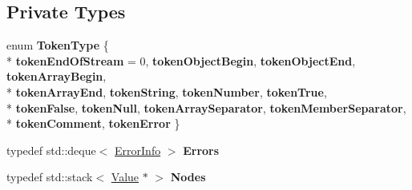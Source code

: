 \subsection*{Private Types}
\begin{DoxyCompactItemize}
\item 
\hypertarget{class_json_1_1_reader_aa35e6ab574dc399a0a645ad98ed66bc9}{}enum {\bfseries Token\+Type} \{ \\*
{\bfseries token\+End\+Of\+Stream} = 0, 
{\bfseries token\+Object\+Begin}, 
{\bfseries token\+Object\+End}, 
{\bfseries token\+Array\+Begin}, 
\\*
{\bfseries token\+Array\+End}, 
{\bfseries token\+String}, 
{\bfseries token\+Number}, 
{\bfseries token\+True}, 
\\*
{\bfseries token\+False}, 
{\bfseries token\+Null}, 
{\bfseries token\+Array\+Separator}, 
{\bfseries token\+Member\+Separator}, 
\\*
{\bfseries token\+Comment}, 
{\bfseries token\+Error}
 \}\label{class_json_1_1_reader_aa35e6ab574dc399a0a645ad98ed66bc9}

\item 
\hypertarget{class_json_1_1_reader_aae51e8f5bab3f067261c842a3ef858e5}{}typedef std\+::deque$<$ \hyperlink{class_json_1_1_reader_1_1_error_info}{Error\+Info} $>$ {\bfseries Errors}\label{class_json_1_1_reader_aae51e8f5bab3f067261c842a3ef858e5}

\item 
\hypertarget{class_json_1_1_reader_a8da2114fe8b8124d41ea2f3434f0171b}{}typedef std\+::stack$<$ \hyperlink{class_json_1_1_value}{Value} $\ast$ $>$ {\bfseries Nodes}\label{class_json_1_1_reader_a8da2114fe8b8124d41ea2f3434f0171b}

\end{DoxyCompactItemize}
